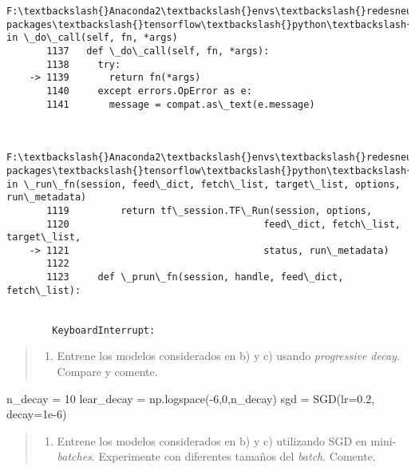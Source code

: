 \documentclass[11pt]{article}
\providecommand{\tightlist}{%
      \setlength{\itemsep}{0pt}\setlength{\parskip}{0pt}}
\newenvironment{Shaded}{}{}
\newcommand{\DecValTok}[1]{\textcolor[rgb]{0.25,0.63,0.44}{{#1}}}
\newcommand{\FloatTok}[1]{\textcolor[rgb]{0.25,0.63,0.44}{{#1}}}
\newcommand{\NormalTok}[1]{{#1}}
\newcommand{\OperatorTok}[1]{\textcolor[rgb]{0.40,0.40,0.40}{{#1}}}
\begin{document}
\begin{Verbatim}[commandchars=\\\{\}]
        F:\textbackslash{}Anaconda2\textbackslash{}envs\textbackslash{}redesneuronales\textbackslash{}lib\textbackslash{}site-packages\textbackslash{}tensorflow\textbackslash{}python\textbackslash{}client\textbackslash{}session.py in \_do\_call(self, fn, *args)
       1137   def \_do\_call(self, fn, *args):
       1138     try:
    -> 1139       return fn(*args)
       1140     except errors.OpError as e:
       1141       message = compat.as\_text(e.message)


        F:\textbackslash{}Anaconda2\textbackslash{}envs\textbackslash{}redesneuronales\textbackslash{}lib\textbackslash{}site-packages\textbackslash{}tensorflow\textbackslash{}python\textbackslash{}client\textbackslash{}session.py in \_run\_fn(session, feed\_dict, fetch\_list, target\_list, options, run\_metadata)
       1119         return tf\_session.TF\_Run(session, options,
       1120                                  feed\_dict, fetch\_list, target\_list,
    -> 1121                                  status, run\_metadata)
       1122 
       1123     def \_prun\_fn(session, handle, feed\_dict, fetch\_list):


        KeyboardInterrupt: 

    \end{Verbatim}

    \begin{quote}
\begin{enumerate}
\def\labelenumi{\alph{enumi})}
\setcounter{enumi}{4}
\tightlist
\item
  Entrene los modelos considerados en b) y c) usando \emph{progressive
  decay}. Compare y comente.
\end{enumerate}
\end{quote}

\begin{Shaded}
\begin{Highlighting}[]
\NormalTok{n_decay }\OperatorTok{=} \DecValTok{10}
\NormalTok{lear_decay }\OperatorTok{=}\NormalTok{ np.logspace(}\OperatorTok{-}\DecValTok{6}\NormalTok{,}\DecValTok{0}\NormalTok{,n_decay)}
\NormalTok{sgd }\OperatorTok{=}\NormalTok{ SGD(lr}\OperatorTok{=}\FloatTok{0.2}\NormalTok{, decay}\OperatorTok{=}\FloatTok{1e-6}\NormalTok{)}
\end{Highlighting}
\end{Shaded}

    \begin{quote}
\begin{enumerate}
\def\labelenumi{\alph{enumi})}
\setcounter{enumi}{5}
\tightlist
\item
  Entrene los modelos considerados en b) y c) utilizando SGD en
  mini-\emph{batches}. Experimente con diferentes tamaños del
  \emph{batch}. Comente.
\end{enumerate}
\end{quote}
\end{document}

